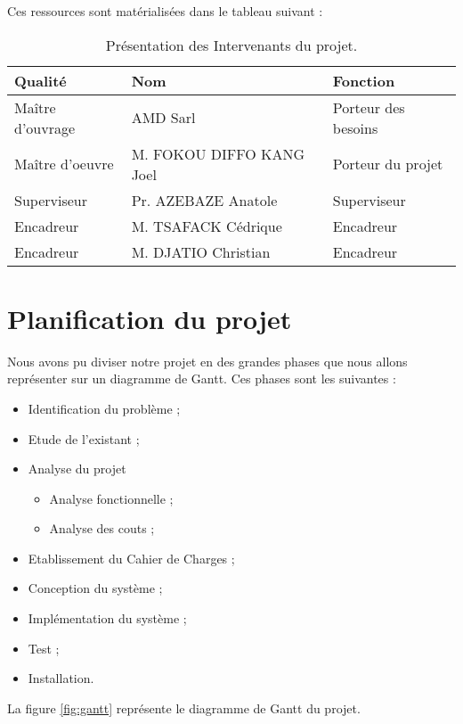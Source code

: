 Ces ressources sont matérialisées dans le tableau suivant :
\begin{table}[H]
    \centering
    \caption{Présentation des Intervenants du projet.}
    \begin{tabular}[t]{|p{4cm}|p{7cm}|p{4cm}|}
        \hline
        \textbf{Qualité } & \textbf{Nom} & \textbf{Fonction} \\
        \hline\hline
        Maître d'ouvrage & AMD Sarl & Porteur des besoins\\
        \hline
        Maître d'oeuvre & M. FOKOU DIFFO KANG Joel & Porteur du projet \\
        \hline
        Superviseur & Pr. AZEBAZE Anatole & Superviseur\\
        \hline
        Encadreur & M. TSAFACK Cédrique & Encadreur\\
        \hline
        Encadreur & M. DJATIO Christian & Encadreur\\
        \hline\hline
    \end{tabular}
    \label{tab:resmat}
\end{table}%



\section{Planification du projet}
Nous avons pu diviser notre projet en des grandes phases que nous allons représenter sur un diagramme de Gantt. Ces phases sont les suivantes : 
\begin{itemize}
    \item Identification du problème ;
    \item Etude de l’existant ;
    \item Analyse du projet
    \begin{itemize}
        \item Analyse fonctionnelle ;
        \item Analyse des couts ;
    \end{itemize}
    \item Etablissement du Cahier de Charges ;
    \item Conception du système ;
    \item Implémentation du système ;
    \item Test ;
    \item Installation.
\end{itemize}

La figure \ref{fig:gantt} représente le diagramme de Gantt du projet.


